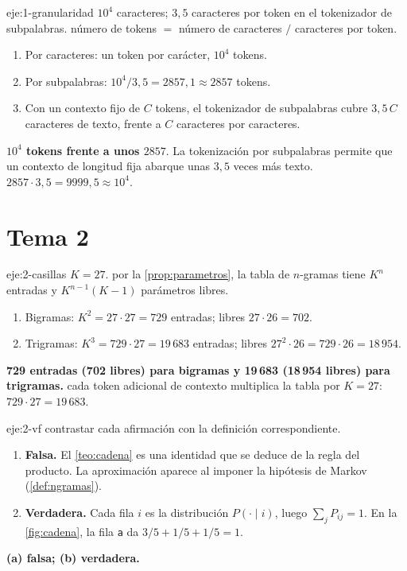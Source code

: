 \begin{solucion}{eje:1-granularidad}
\datos $10^{4}$ caracteres; $3{,}5$ caracteres por token en el tokenizador de subpalabras.
\planteamiento número de tokens $=$ número de caracteres $/$ caracteres por token.
\pasos
\begin{enumerate}[label=\arabic*.]
  \item Por caracteres: un token por carácter, $10^{4}$ tokens.
  \item Por subpalabras: $10^{4}/3{,}5=2857{,}1\approx 2857$ tokens.
  \item Con un contexto fijo de $C$ tokens, el tokenizador de subpalabras cubre $3{,}5\,C$ caracteres de texto, frente a $C$ caracteres por caracteres.
\end{enumerate}
\resultado \textbf{$10^{4}$ tokens frente a unos $2857$}. La tokenización por subpalabras permite que un contexto de longitud fija abarque unas $3{,}5$ veces más texto.
\comprobacion $2857\cdot 3{,}5=9999{,}5\approx 10^{4}$.
\end{solucion}

\section{Tema 2}

\begin{solucion}{eje:2-casillas}
\datos $K=27$.
\planteamiento por la \cref{prop:parametros}, la tabla de $n$-gramas tiene $K^{n}$ entradas y $K^{n-1}(K-1)$ parámetros libres.
\pasos
\begin{enumerate}[label=\arabic*.]
  \item Bigramas: $K^{2}=27\cdot 27=729$ entradas; libres $27\cdot 26=702$.
  \item Trigramas: $K^{3}=729\cdot 27=19\,683$ entradas; libres $27^{2}\cdot 26=729\cdot 26=18\,954$.
\end{enumerate}
\resultado \textbf{729 entradas (702 libres) para bigramas y 19\,683 (18\,954 libres) para trigramas.}
\comprobacion cada token adicional de contexto multiplica la tabla por $K=27$: $729\cdot 27=19\,683$.
\end{solucion}

\begin{solucion}{eje:2-vf}
\planteamiento contrastar cada afirmación con la definición correspondiente.
\pasos
\begin{enumerate}[label=(\alph*)]
  \item \textbf{Falsa.} El \cref{teo:cadena} es una identidad que se deduce de la regla del producto. La aproximación aparece al imponer la hipótesis de Markov (\cref{def:ngramas}).
  \item \textbf{Verdadera.} Cada fila $i$ es la distribución $P(\cdot\mid i)$, luego $\sum_j P_{ij}=1$. En la \cref{fig:cadena}, la fila \texttt{a} da $3/5+1/5+1/5=1$.
\end{enumerate}
\resultado \textbf{(a) falsa; (b) verdadera.}
\end{solucion}

